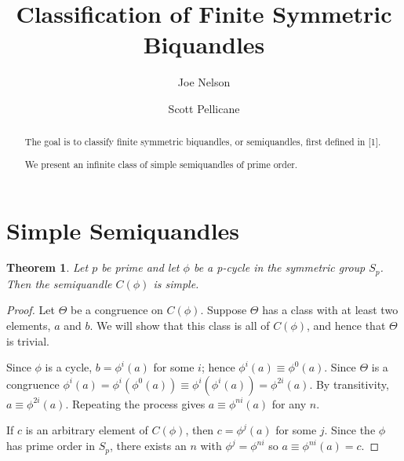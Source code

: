 \documentclass{amsart}
\newtheorem{thm}{Theorem}[section]
\theoremstyle{definition}
\numberwithin{equation}{section}
\begin{document}
\title{Classification of Finite Symmetric Biquandles}

\author{Joe Nelson}
\author{Scott Pellicane}


\begin{abstract}
The goal is to classify finite symmetric biquandles, or semiquandles, first defined in [1].

We present an infinite class of simple semiquandles of prime order.
\end{abstract}

\maketitle



\section{Simple Semiquandles}

\begin{thm}
Let $p$ be prime and let $\phi$ be a p-cycle in the symmetric group $S_p$.
Then the semiquandle $C(\phi)$ is simple.
\end{thm}
\begin{proof}
Let $\Theta$ be a congruence on $C(\phi)$. Suppose $\Theta$ has a class with
at least two elements, $a$ and $b$. We will show that this class is all of
$C(\phi)$, and hence that $\Theta$ is trivial.

Since $\phi$ is a cycle, $b = \phi^{i}(a)$ for some $i$; hence
$\phi^{i}(a) \equiv \phi^{0}(a)$. Since $\Theta$ is a congruence $\phi^{i}(a) =
\phi^{i}(\phi^{0}(a)) \equiv \phi^{i}(\phi^{i}(a)) = \phi^{2i}(a)$. By transitivity,
$a \equiv \phi^{2i}(a)$. Repeating the process gives $a \equiv \phi^{ni}(a)$ for any $n$.

If $c$ is an arbitrary element of $C(\phi)$, then $c = \phi^{j}(a)$ for some $j$.
Since the $\phi$ has prime order in $S_p$, there exists an $n$ with
$\phi^{j} = \phi^{ni}$ so $a \equiv \phi^{ni}(a) = c$.
\end{proof}


\end{document}
